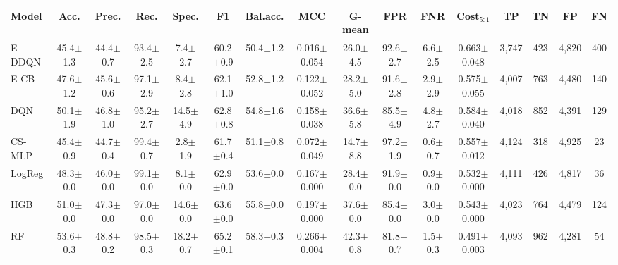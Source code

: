 \begin{tabular}{lccccccccccccccc}
\toprule
Model & Acc. & Prec. & Rec. & Spec. & F1 & Bal.acc. & MCC & G-mean & FPR & FNR & Cost$_{5:1}$ & TP & TN & FP & FN \\
\midrule
E-DDQN & 45.4$\pm$1.3 & 44.4$\pm$0.7 & 93.4$\pm$2.5 & 7.4$\pm$2.7 & 60.2$\pm$0.9 & 50.4$\pm$1.2 & 0.016$\pm$0.054 & 26.0$\pm$4.5 & 92.6$\pm$2.7 & 6.6$\pm$2.5 & 0.663$\pm$0.048 & 3,747 & 423 & 4,820 & 400 \\
E-CB & 47.6$\pm$1.2 & 45.6$\pm$0.6 & 97.1$\pm$2.9 & 8.4$\pm$2.8 & 62.1$\pm$1.0 & 52.8$\pm$1.2 & 0.122$\pm$0.052 & 28.2$\pm$5.0 & 91.6$\pm$2.8 & 2.9$\pm$2.9 & 0.575$\pm$0.055 & 4,007 & 763 & 4,480 & 140 \\
DQN & 50.1$\pm$1.9 & 46.8$\pm$1.0 & 95.2$\pm$2.7 & 14.5$\pm$4.9 & 62.8$\pm$0.8 & 54.8$\pm$1.6 & 0.158$\pm$0.038 & 36.6$\pm$5.8 & 85.5$\pm$4.9 & 4.8$\pm$2.7 & 0.584$\pm$0.040 & 4,018 & 852 & 4,391 & 129 \\
CS-MLP & 45.4$\pm$0.9 & 44.7$\pm$0.4 & 99.4$\pm$0.7 & 2.8$\pm$1.9 & 61.7$\pm$0.4 & 51.1$\pm$0.8 & 0.072$\pm$0.049 & 14.7$\pm$8.8 & 97.2$\pm$1.9 & 0.6$\pm$0.7 & 0.557$\pm$0.012 & 4,124 & 318 & 4,925 & 23 \\
LogReg & 48.3$\pm$0.0 & 46.0$\pm$0.0 & 99.1$\pm$0.0 & 8.1$\pm$0.0 & 62.9$\pm$0.0 & 53.6$\pm$0.0 & 0.167$\pm$0.000 & 28.4$\pm$0.0 & 91.9$\pm$0.0 & 0.9$\pm$0.0 & 0.532$\pm$0.000 & 4,111 & 426 & 4,817 & 36 \\
HGB & 51.0$\pm$0.0 & 47.3$\pm$0.0 & 97.0$\pm$0.0 & 14.6$\pm$0.0 & 63.6$\pm$0.0 & 55.8$\pm$0.0 & 0.197$\pm$0.000 & 37.6$\pm$0.0 & 85.4$\pm$0.0 & 3.0$\pm$0.0 & 0.543$\pm$0.000 & 4,023 & 764 & 4,479 & 124 \\
RF & 53.6$\pm$0.3 & 48.8$\pm$0.2 & 98.5$\pm$0.3 & 18.2$\pm$0.7 & 65.2$\pm$0.1 & 58.3$\pm$0.3 & 0.266$\pm$0.004 & 42.3$\pm$0.8 & 81.8$\pm$0.7 & 1.5$\pm$0.3 & 0.491$\pm$0.003 & 4,093 & 962 & 4,281 & 54 \\
\bottomrule
\end{tabular}
